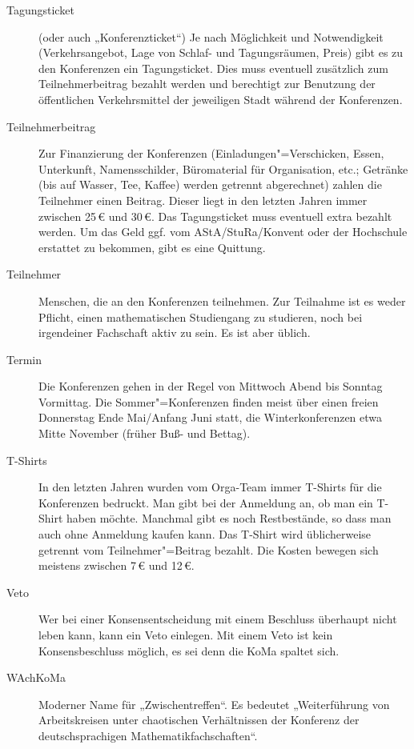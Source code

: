 \begin{description}
\item[Tagungsticket] (oder auch „Konferenzticket“) Je nach Möglichkeit und
	Notwendigkeit (Verkehrsangebot, Lage von Schlaf- und Tagungsräumen, Preis)
	gibt es zu den Konferenzen ein Tagungsticket. Dies muss eventuell
	zusätzlich zum Teilnehmerbeitrag bezahlt werden und berechtigt zur
	Benutzung der öffentlichen Verkehrsmittel der jeweiligen Stadt während der
	Konferenzen.

\item[Teilnehmerbeitrag] Zur Finanzierung der Konferenzen
	(Einladungen"=Verschicken, Essen, Unterkunft, Namensschilder, Büromaterial
	für Organisation, etc.; Getränke (bis auf Wasser, Tee, Kaffee) werden
	getrennt abgerechnet) zahlen die Teilnehmer einen Beitrag. Dieser liegt in
	den letzten Jahren immer zwischen 25\,€ und 30\,€. Das Tagungsticket muss
	eventuell extra bezahlt werden. Um das Geld ggf. vom AStA/StuRa/Konvent
	oder der Hochschule erstattet zu bekommen, gibt es eine Quittung.

\item[Teilnehmer] Menschen, die an den Konferenzen teilnehmen.  Zur Teilnahme
	ist es weder Pflicht, einen mathematischen Studiengang zu studieren, noch
	bei irgendeiner Fachschaft aktiv zu sein. Es ist aber üblich.

\item[Termin] Die Konferenzen gehen in der Regel von Mittwoch Abend bis Sonntag
	Vormittag. Die Sommer"=Konferenzen finden meist über einen freien Donnerstag
	Ende Mai/Anfang Juni statt, die Winterkonferenzen etwa Mitte November
	(früher Buß- und Bettag).

\item[T-Shirts] In den letzten Jahren wurden vom Orga-Team immer T-Shirts für
	die Konferenzen bedruckt. Man gibt bei der Anmeldung an, ob man ein T-Shirt
	haben möchte. Manchmal gibt es noch Restbestände, so dass man auch ohne
	Anmeldung kaufen kann. Das T-Shirt wird üblicherweise getrennt vom
	Teilnehmer"=Beitrag bezahlt. Die Kosten bewegen sich meistens zwischen 7\,€
	und 12\,€.

\item[Veto] Wer bei einer Konsensentscheidung mit einem Beschluss überhaupt
	nicht leben kann, kann ein Veto einlegen. Mit einem Veto ist kein
	Konsensbeschluss möglich, es sei denn die KoMa spaltet sich.

\item[WAchKoMa] Moderner Name für „Zwischentreffen“. Es bedeutet „Weiterführung
	von Arbeitskreisen unter chaotischen Verhältnissen der Konferenz der
	deutschsprachigen Mathematikfachschaften“.


\end{description}
